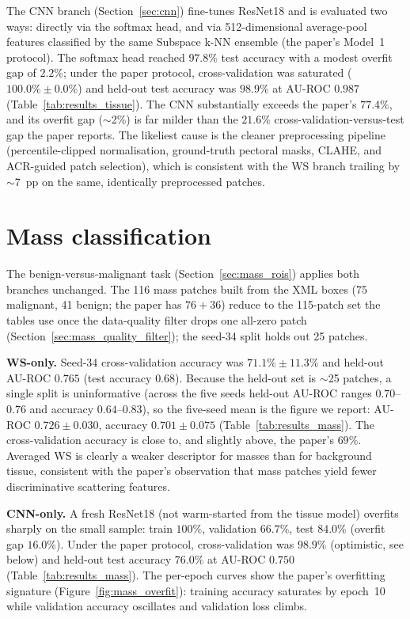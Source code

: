 The CNN branch (Section~\ref{sec:cnn}) fine-tunes ResNet18 and is evaluated two ways: directly via the softmax head, and via 512-dimensional average-pool features classified by the same Subspace k-NN ensemble (the paper's Model~1 protocol). The softmax head reached $97.8\%$ test accuracy with a modest overfit gap of $2.2\%$; under the paper protocol, cross-validation was saturated ($100.0\% \pm 0.0\%$) and held-out test accuracy was $98.9\%$ at AU-ROC $0.987$ (Table~\ref{tab:results_tissue}). The CNN substantially exceeds the paper's $77.4\%$, and its overfit gap ($\sim$2\%) is far milder than the $21.6\%$ cross-validation-versus-test gap the paper reports. The likeliest cause is the cleaner preprocessing pipeline (percentile-clipped normalisation, ground-truth pectoral masks, CLAHE, and ACR-guided patch selection), which is consistent with the WS branch trailing by $\sim$7~pp on the same, identically preprocessed patches.

\section{Mass classification} \label{sec:stage5}

The benign-versus-malignant task (Section~\ref{sec:mass_rois}) applies both branches unchanged. The 116 mass patches built from the XML boxes (75 malignant, 41 benign; the paper has $76+36$) reduce to the 115-patch set the tables use once the data-quality filter drops one all-zero patch (Section~\ref{sec:mass_quality_filter}); the seed-34 split holds out 25 patches.

\textbf{WS-only.} Seed-34 cross-validation accuracy was $71.1\% \pm 11.3\%$ and held-out AU-ROC $0.765$ (test accuracy $0.68$). Because the held-out set is $\sim$25 patches, a single split is uninformative (across the five seeds held-out AU-ROC ranges $0.70$--$0.76$ and accuracy $0.64$--$0.83$), so the five-seed mean is the figure we report: AU-ROC $0.726 \pm 0.030$, accuracy $0.701 \pm 0.075$ (Table~\ref{tab:results_mass}). The cross-validation accuracy is close to, and slightly above, the paper's $69\%$. Averaged WS is clearly a weaker descriptor for masses than for background tissue, consistent with the paper's observation that mass patches yield fewer discriminative scattering features.

\textbf{CNN-only.} A fresh ResNet18 (not warm-started from the tissue model) overfits sharply on the small sample: train $100\%$, validation $66.7\%$, test $84.0\%$ (overfit gap $16.0\%$). Under the paper protocol, cross-validation was $98.9\%$ (optimistic, see below) and held-out test accuracy $76.0\%$ at AU-ROC $0.750$ (Table~\ref{tab:results_mass}). The per-epoch curves show the paper's overfitting signature (Figure~\ref{fig:mass_overfit}): training accuracy saturates by epoch~10 while validation accuracy oscillates and validation loss climbs.


